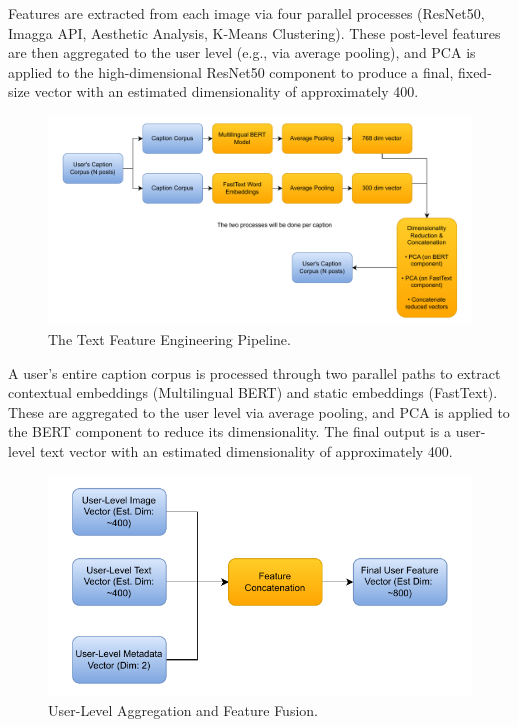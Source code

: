 Features are extracted from each image via four parallel processes (ResNet50, Imagga API, Aesthetic Analysis, K-Means Clustering). These post-level features are then aggregated to the user level (e.g., via average pooling), and PCA is applied to the high-dimensional ResNet50 component to produce a final, fixed-size vector with an estimated dimensionality of approximately 400.

\begin{figure}[H]
	\centering
	\includegraphics[width=\textwidth]{"figures/Text-Pipeline-Diagram.pdf"}
	\caption{The Text Feature Engineering Pipeline. }
	\label{fig:text_pipeline_diagram}
\end{figure}

 A user's entire caption corpus is processed through two parallel paths to extract contextual embeddings (Multilingual BERT) and static embeddings (FastText). These are aggregated to the user level via average pooling, and PCA is applied to the BERT component to reduce its dimensionality. The final output is a user-level text vector with an estimated dimensionality of approximately 400.

\begin{figure}[H]
	\centering
	\includegraphics[width=\textwidth]{"figures/Fusion-Diagram.pdf"}
	\caption{User-Level Aggregation and Feature Fusion.}
	\label{fig:fusion_diagram}
\end{figure}

